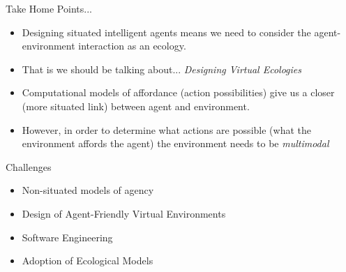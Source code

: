 \documentclass[aspectratio=1610,xcolor=dvipsnames,t]{beamer}
\begin{document}
\begin{frame}{Take Home Points...} 
    \begin{itemize} 
        \item Designing situated intelligent agents means we need to consider the 
          agent-environment interaction as an ecology. 
        \item That is we should be talking about... \emph{Designing Virtual Ecologies}
        \item Computational models of affordance (action possibilities) give us a
          closer (more situated link) between agent and environment.
        \item However, in order to determine what actions are possible (what the
          environment affords the agent) the environment needs to be
          \emph{multimodal} 
\end{itemize} 

    \begin{alertblock}{Challenges}
        \begin{itemize}
            \item Non-situated models of agency
            \item Design of Agent-Friendly Virtual Environments
            \item Software Engineering 
            \item Adoption of Ecological Models
        \end{itemize} 
    \end{alertblock} 
\end{frame} 
\end{document}
